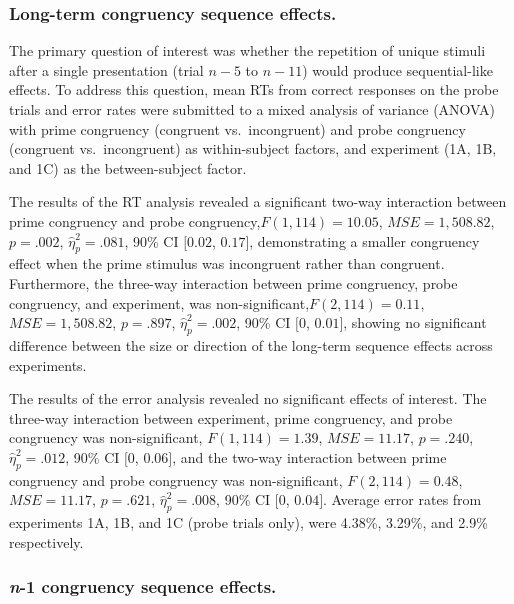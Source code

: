 \documentclass[]{DissertateCUNY}
\begin{document}
\hypertarget{long-term-congruency-sequence-effects.}{%
\subsubsection{Long-term congruency sequence
effects.}\label{long-term-congruency-sequence-effects.}}

The primary question of interest was whether the repetition of unique
stimuli after a single presentation (trial \(n-5\) to \(n-11\)) would
produce sequential-like effects. To address this question, mean RTs from
correct responses on the probe trials and error rates were submitted to
a mixed analysis of variance (ANOVA) with prime congruency (congruent
vs.~incongruent) and probe congruency (congruent vs.~incongruent) as
within-subject factors, and experiment (1A, 1B, and 1C) as the
between-subject factor.

The results of the RT analysis revealed a significant two-way
interaction between prime congruency and probe
congruency,\(F(1, 114) = 10.05\), \(\mathit{MSE} = 1,508.82\),
\(p = .002\), \(\hat{\eta}^2_p = .081\), 90\% CI \([0.02\), \(0.17]\),
demonstrating a smaller congruency effect when the prime stimulus was
incongruent rather than congruent. Furthermore, the three-way
interaction between prime congruency, probe congruency, and experiment,
was non-significant,\(F(2, 114) = 0.11\), \(\mathit{MSE} = 1,508.82\),
\(p = .897\), \(\hat{\eta}^2_p = .002\), 90\% CI \([0\), \(0.01]\),
showing no significant difference between the size or direction of the
long-term sequence effects across experiments.

The results of the error analysis revealed no significant effects of
interest. The three-way interaction between experiment, prime
congruency, and probe congruency was non-significant,
\(F(1, 114) = 1.39\), \(\mathit{MSE} = 11.17\), \(p = .240\),
\(\hat{\eta}^2_p = .012\), 90\% CI \([0\), \(0.06]\), and the two-way
interaction between prime congruency and probe congruency was
non-significant, \(F(2, 114) = 0.48\), \(\mathit{MSE} = 11.17\),
\(p = .621\), \(\hat{\eta}^2_p = .008\), 90\% CI \([0\), \(0.04]\).
Average error rates from experiments 1A, 1B, and 1C (probe trials only),
were 4.38\%, 3.29\%, and 2.9\% respectively.

\hypertarget{congruency-sequence-effects.-1}{%
\subsubsection{\texorpdfstring{\textit{n}-1 congruency sequence
effects.}{-1 congruency sequence effects.}}\label{congruency-sequence-effects.-1}}
\end{document}
